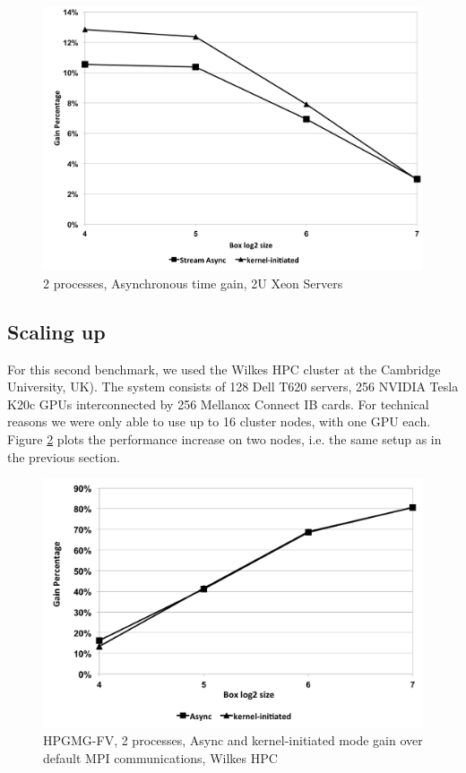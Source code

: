 \documentclass[conference]{IEEEtran}
\begin{document}
\begin{figure}[h]
\centering
\includegraphics[scale=0.3]{gain_ivy.png}
\caption{2 processes, Asynchronous time gain, 2U Xeon Servers}
\label{fig:gain_ivy}
\end{figure}

\subsection{Scaling up}

For this second benchmark, we used the Wilkes HPC cluster at the Cambridge
University, UK)\cite{wilkes}.
% 
The system consists of 128 Dell T620 servers, 256 NVIDIA Tesla K20c GPUs
interconnected by 256 Mellanox Connect IB cards.
% 
For technical reasons we were only able to use up to 16 cluster nodes,
with one GPU each.
%
Figure \ref{fig:gain_wilkes} plots the performance increase on two nodes,
i.e. the same setup as in the previous section.

\begin{figure}[h]
\includegraphics[scale=0.4]{gain_wilkes.png}
\caption{HPGMG-FV, 2 processes, Async and kernel-initiated mode gain over
  default MPI communications, Wilkes HPC}
\label{fig:gain_wilkes}
\end{figure}
\end{document}
